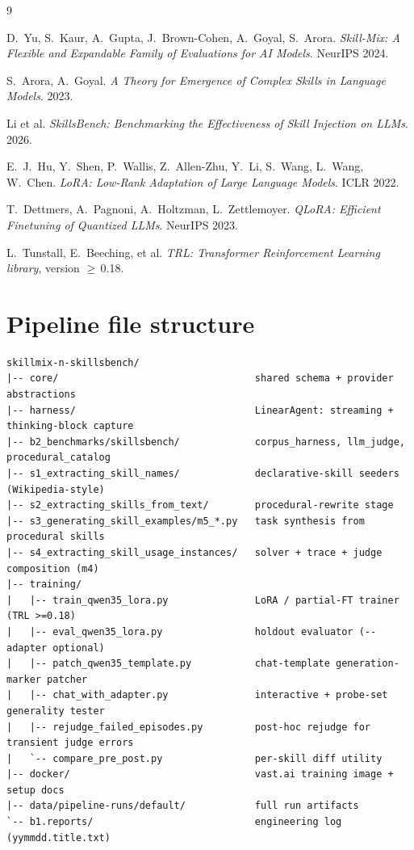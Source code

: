 \documentclass[10pt]{article}
\begin{document}
\begin{thebibliography}{9}

D.~Yu, S.~Kaur, A.~Gupta, J.~Brown-Cohen, A.~Goyal, S.~Arora.
\textit{Skill-Mix: A Flexible and Expandable Family of Evaluations for AI Models}.
NeurIPS 2024.

S.~Arora, A.~Goyal.
\textit{A Theory for Emergence of Complex Skills in Language Models}.
2023.

Li et al.
\textit{SkillsBench: Benchmarking the Effectiveness of Skill Injection on LLMs}.
2026.

E.~J.~Hu, Y.~Shen, P.~Wallis, Z.~Allen-Zhu, Y.~Li, S.~Wang, L.~Wang, W.~Chen.
\textit{LoRA: Low-Rank Adaptation of Large Language Models}.
ICLR 2022.

T.~Dettmers, A.~Pagnoni, A.~Holtzman, L.~Zettlemoyer.
\textit{QLoRA: Efficient Finetuning of Quantized LLMs}.
NeurIPS 2023.

L.~Tunstall, E.~Beeching, et al.
\textit{TRL: Transformer Reinforcement Learning library}, version $\geq$\,0.18.

\end{thebibliography}

\appendix

\section{Pipeline file structure}\label{app:pipeline}
\begin{verbatim}
skillmix-n-skillsbench/
|-- core/                                  shared schema + provider abstractions
|-- harness/                               LinearAgent: streaming + thinking-block capture
|-- b2_benchmarks/skillsbench/             corpus_harness, llm_judge, procedural_catalog
|-- s1_extracting_skill_names/             declarative-skill seeders (Wikipedia-style)
|-- s2_extracting_skills_from_text/        procedural-rewrite stage
|-- s3_generating_skill_examples/m5_*.py   task synthesis from procedural skills
|-- s4_extracting_skill_usage_instances/   solver + trace + judge composition (m4)
|-- training/
|   |-- train_qwen35_lora.py               LoRA / partial-FT trainer (TRL >=0.18)
|   |-- eval_qwen35_lora.py                holdout evaluator (--adapter optional)
|   |-- patch_qwen35_template.py           chat-template generation-marker patcher
|   |-- chat_with_adapter.py               interactive + probe-set generality tester
|   |-- rejudge_failed_episodes.py         post-hoc rejudge for transient judge errors
|   `-- compare_pre_post.py                per-skill diff utility
|-- docker/                                vast.ai training image + setup docs
|-- data/pipeline-runs/default/            full run artifacts
`-- b1.reports/                            engineering log (yymmdd.title.txt)
\end{verbatim}
\end{document}
